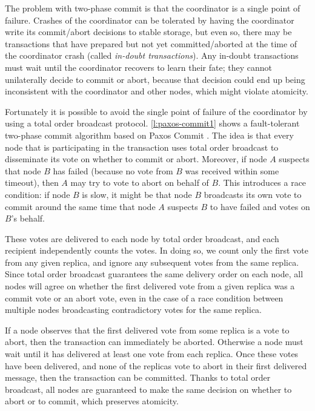 The problem with two-phase commit is that the coordinator is a single point of failure.
Crashes of the coordinator can be tolerated by having the coordinator write its commit/abort decisions to stable storage, but even so, there may be transactions that have prepared but not yet committed/aborted at the time of the coordinator crash (called \emph{in-doubt transactions}).
Any in-doubt transactions must wait until the coordinator recovers to learn their fate; they cannot unilaterally decide to commit or abort, because that decision could end up being inconsistent with the coordinator and other nodes, which might violate atomicity.


Fortunately it is possible to avoid the single point of failure of the coordinator by using a total order broadcast protocol.
\autoref{l:paxos-commit1} shows a fault-tolerant two-phase commit algorithm based on Paxos Commit \citep{Gray:2006}.
The idea is that every node that is participating in the transaction uses total order broadcast to disseminate its vote on whether to commit or abort.
Moreover, if node $A$ suspects that node $B$ has failed (because no vote from $B$ was received within some timeout), then $A$ may try to vote to abort on behalf of $B$.
This introduces a race condition: if node $B$ is slow, it might be that node $B$ broadcasts its own vote to commit around the same time that node $A$ suspects $B$ to have failed and votes on $B$'s behalf.

These votes are delivered to each node by total order broadcast, and each recipient independently counts the votes.
In doing so, we count only the first vote from any given replica, and ignore any subsequent votes from the same replica.
Since total order broadcast guarantees the same delivery order on each node, all nodes will agree on whether the first delivered vote from a given replica was a commit vote or an abort vote, even in the case of a race condition between multiple nodes broadcasting contradictory votes for the same replica.

If a node observes that the first delivered vote from some replica is a vote to abort, then the transaction can immediately be aborted.
Otherwise a node must wait until it has delivered at least one vote from each replica.
Once these votes have been delivered, and none of the replicas vote to abort in their first delivered message, then the transaction can be committed.
Thanks to total order broadcast, all nodes are guaranteed to make the same decision on whether to abort or to commit, which preserves atomicity.

